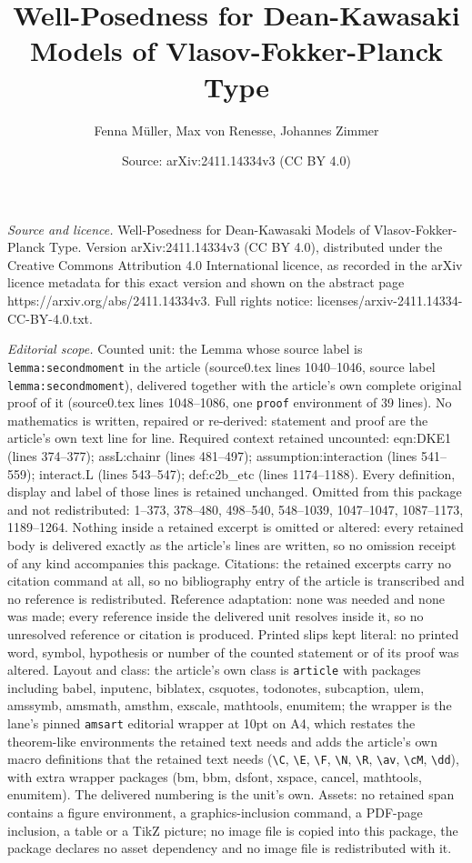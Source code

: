 \documentclass[10pt,a4paper]{amsart}
\title[Well-Posedness for Dean-Kawasaki Models of Vlasov-Fokker-Pla]{Well-Posedness for Dean-Kawasaki Models of Vlasov-Fokker-Planck Type}
\author{Fenna M\"uller, Max von Renesse, Johannes Zimmer}
\date{Source: arXiv:2411.14334v3 (CC BY 4.0)}
\begin{document}
\maketitle

\noindent\emph{Source and licence.} Well-Posedness for Dean-Kawasaki Models of Vlasov-Fokker-Planck Type. Version arXiv:2411.14334v3 (CC BY 4.0), distributed under the Creative Commons Attribution 4.0 International licence, as recorded in the arXiv licence metadata for this exact version and shown on the abstract page https://arxiv.org/abs/2411.14334v3. Full rights notice: licenses/arxiv-2411.14334-CC-BY-4.0.txt.\par\smallskip

\noindent\textit{Editorial scope.} Counted unit: the Lemma whose source label is \texttt{lemma:secondmoment} in the article (source0.tex lines 1040--1046, source label \texttt{lemma:secondmoment}), delivered together with the article's own complete original proof of it (source0.tex lines 1048--1086, one \texttt{proof} environment of 39 lines). No mathematics is written, repaired or re-derived: statement and proof are the article's own text line for line. Required context retained uncounted: eqn:DKE1 (lines 374--377); assL:chainr (lines 481--497); assumption:interaction (lines 541--559); interact.L (lines 543--547); def:c2b\_etc (lines 1174--1188). Every definition, display and label of those lines is retained unchanged. Omitted from this package and not redistributed: 1--373, 378--480, 498--540, 548--1039, 1047--1047, 1087--1173, 1189--1264. Nothing inside a retained excerpt is omitted or altered: every retained body is delivered exactly as the article's lines are written, so no omission receipt of any kind accompanies this package. Citations: the retained excerpts carry no citation command at all, so no bibliography entry of the article is transcribed and no reference is redistributed. Reference adaptation: none was needed and none was made; every reference inside the delivered unit resolves inside it, so no unresolved reference or citation is produced. Printed slips kept literal: no printed word, symbol, hypothesis or number of the counted statement or of its proof was altered. Layout and class: the article's own class is \texttt{article} with packages including babel, inputenc, biblatex, csquotes, todonotes, subcaption, ulem, amssymb, amsmath, amsthm, exscale, mathtools, enumitem; the wrapper is the lane's pinned \texttt{amsart} editorial wrapper at 10pt on A4, which restates the theorem-like environments the retained text needs and adds the article's own macro definitions that the retained text needs (\texttt{\textbackslash C}, \texttt{\textbackslash E}, \texttt{\textbackslash F}, \texttt{\textbackslash N}, \texttt{\textbackslash R}, \texttt{\textbackslash av}, \texttt{\textbackslash cM}, \texttt{\textbackslash dd}), with extra wrapper packages (bm, bbm, dsfont, xspace, cancel, mathtools, enumitem). The delivered numbering is the unit's own. Assets: no retained span contains a figure environment, a graphics-inclusion command, a PDF-page inclusion, a table or a TikZ picture; no image file is copied into this package, the package declares no asset dependency and no image file is redistributed with it. 
\end{document}
